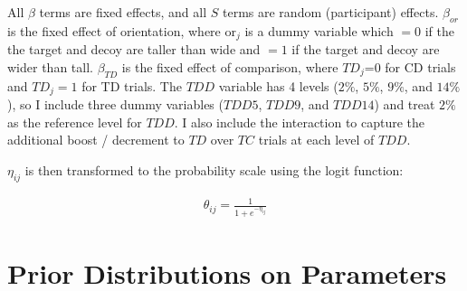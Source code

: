 All $\beta$ terms are fixed effects, and all $S$ terms are random (participant) effects. $\beta_{or}$ is the fixed effect of orientation, where $\text{or}_{j}$ is a dummy variable which $=0$ if the the target and decoy are taller than wide and $=1$ if the target and decoy are wider than tall. $\beta_{TD}$ is the fixed effect of comparison, where $TD_{j}$=0 for CD trials and $TD_{j}=1$ for TD trials.  The $TDD$ variable has 4 levels ($2\%$, $5\%$, $9\%$, and $14\%$), so I include three dummy variables ($TDD5$, $TDD9$, and $TDD14$) and treat $2\%$ as the reference level for $TDD$. I also include the interaction to capture the additional boost / decrement to $TD$ over $TC$ trials at each level of $TDD$. 

$\eta_{ij}$ is then transformed to the probability scale using the logit function:

\begin{align}
    \theta_{ij}=\frac{1}{1+e^{-\eta_{ij}}}
\end{align}

\section{Prior Distributions on Parameters}

